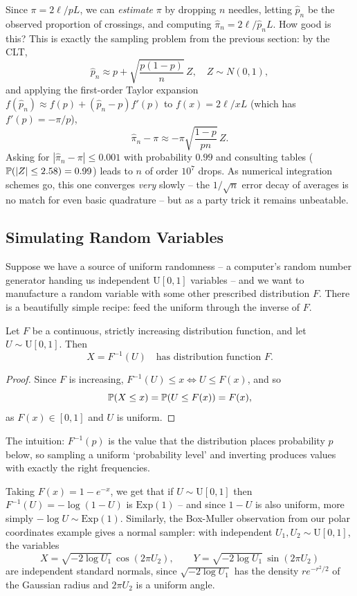 \documentclass[a4paper]{scrartcl}
\begin{document}
Since $\pi = 2\ell/pL$, we can \emph{estimate} $\pi$ by dropping $n$ needles, letting $\hat{p}_n$ be the observed proportion of crossings, and computing $\hat\pi_n = 2\ell/\hat{p}_n L$. How good is this? This is exactly the sampling problem from the previous section: by the CLT,
$$
\hat p_n \approx p + \sqrt{\frac{p(1-p)}{n}}\,Z, \quad Z \sim N(0,1),
$$
and applying the first-order Taylor expansion $f(\hat p_n) \approx f(p) + (\hat p_n - p)f'(p)$ to $f(x) = 2\ell/xL$ (which has $f'(p) = -\pi/p$),
$$
\hat\pi_n - \pi \approx -\pi\sqrt{\frac{1 - p}{pn}}\, Z.
$$
Asking for $|\hat\pi_n - \pi| \leq 0.001$ with probability $0.99$ and consulting tables ($\mathbb{P}(|Z| \leq 2.58) = 0.99$) leads to $n$ of order $10^7$ drops. As numerical integration schemes go, this one converges \emph{very} slowly -- the $1/\sqrt{n}$ error decay of averages is no match for even basic quadrature -- but as a party trick it remains unbeatable.

\subsection{Simulating Random Variables}

Suppose we have a source of uniform randomness -- a computer's random number generator handing us independent $\mathrm{U}[0, 1]$ variables -- and we want to manufacture a random variable with some other prescribed distribution $F$. There is a beautifully simple recipe: feed the uniform through the inverse of $F$.

\begin{theorem}
	Let $F$ be a continuous, strictly increasing distribution function, and let $U \sim \mathrm{U}[0, 1]$. Then
	$$
	X = F^{-1}(U) \quad \text{has distribution function } F.
	$$
\end{theorem}
\begin{proof}
	Since $F$ is increasing, $F^{-1}(U) \leq x \iff U \leq F(x)$, and so
	$$
	\mathbb{P}(X \leq x) = \mathbb{P}(U \leq F(x)) = F(x),
	$$
	as $F(x) \in [0, 1]$ and $U$ is uniform.
\end{proof}

The intuition: $F^{-1}(p)$ is the value that the distribution places probability $p$ below, so sampling a uniform `probability level' and inverting produces values with exactly the right frequencies.

\begin{example}
	Taking $F(x) = 1 - e^{-x}$, we get that if $U \sim \mathrm{U}[0,1]$ then $F^{-1}(U) = -\log(1 - U)$ is $\mathrm{Exp}(1)$ -- and since $1 - U$ is also uniform, more simply $-\log U \sim \mathrm{Exp}(1)$. Similarly, the Box-Muller observation from our polar coordinates example gives a normal sampler: with independent $U_1, U_2 \sim \mathrm{U}[0,1]$, the variables
	$$
	X = \sqrt{-2\log U_1}\,\cos(2\pi U_2), \qquad Y = \sqrt{-2\log U_1}\,\sin(2\pi U_2)
	$$
	are independent standard normals, since $\sqrt{-2\log U_1}$ has the density $re^{-r^2/2}$ of the Gaussian radius and $2\pi U_2$ is a uniform angle.
\end{example}
\end{document}

